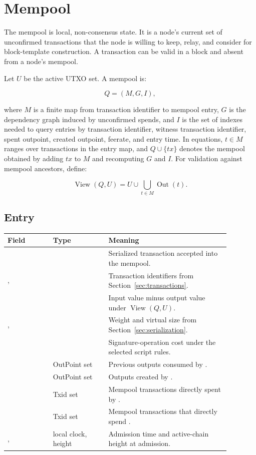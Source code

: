 \section{Mempool}
\label{sec:mempool}

The mempool is local, non-consensus state. It is a node's current set of
unconfirmed transactions that the node is willing to keep, relay, and consider
for block-template construction. A transaction can be valid in a block and
absent from a node's mempool.

Let \(U\) be the active UTXO set. A mempool is:

\[
  Q = (M,G,I),
\]

where \(M\) is a finite map from transaction identifier to mempool entry, \(G\)
is the dependency graph induced by unconfirmed spends, and \(I\) is the set of
indexes needed to query entries by transaction identifier, witness transaction
identifier, spent outpoint, created outpoint, feerate, and entry time.
In equations, \(t \in M\) ranges over transactions in the entry map, and
\(Q \cup \{tx\}\) denotes the mempool obtained by adding \(tx\) to \(M\) and
recomputing \(G\) and \(I\).
For validation against mempool ancestors, define:

\[
  \operatorname{View}(Q,U)=U \cup \bigcup_{t \in M}\operatorname{Out}(t).
\]

\subsection{Entry}

\begin{longtable}{@{}L{0.18\linewidth}L{0.22\linewidth}L{0.48\linewidth}@{}}
\toprule
Field & Type & Meaning \\
\midrule
{} &  & Serialized transaction accepted into the mempool. \\
,  &  & Transaction identifiers from Section~\ref{sec:transactions}. \\
 &  & Input value minus output value under \(\operatorname{View}(Q,U)\). \\
,  &  & Weight and virtual size from Section~\ref{sec:serialization}. \\
 &  & Signature-operation cost under the selected script rules. \\
 & OutPoint set & Previous outputs consumed by . \\
 & OutPoint set & Outputs created by . \\
 & Txid set & Mempool transactions directly spent by . \\
 & Txid set & Mempool transactions that directly spend . \\
,  & local clock, height & Admission time and active-chain height at admission. \\
\bottomrule
\end{longtable}


